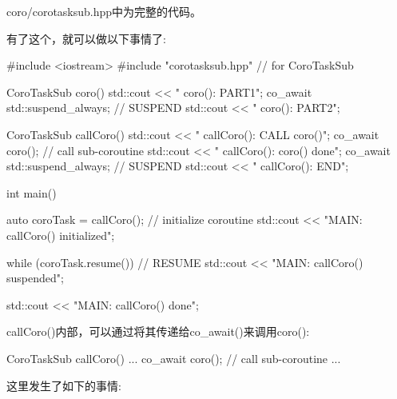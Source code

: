 coro/corotasksub.hpp中为完整的代码。

有了这个，就可以做以下事情了:


\begin{cpp}
#include <iostream>
#include "corotasksub.hpp" // for CoroTaskSub

CoroTaskSub coro()
{
	std::cout << " coro(): PART1\n";
	co_await std::suspend_always{}; // SUSPEND
	std::cout << " coro(): PART2\n";
}

CoroTaskSub callCoro()
{
	std::cout << " callCoro(): CALL coro()\n";
	co_await coro(); // call sub-coroutine
	std::cout << " callCoro(): coro() done\n";
	co_await std::suspend_always{}; // SUSPEND
	std::cout << " callCoro(): END\n";
}

int main()
{
	auto coroTask = callCoro(); // initialize coroutine
	std::cout << "MAIN: callCoro() initialized\n";

	while (coroTask.resume()) { // RESUME
		std::cout << "MAIN: callCoro() suspended\n";
	}

	std::cout << "MAIN: callCoro() done\n";
}
\end{cpp}

callCoro()内部，可以通过将其传递给co\_await()来调用coro():

\begin{cpp}
CoroTaskSub callCoro()
{
	...
	co_await coro(); // call sub-coroutine
	...
}
\end{cpp}

这里发生了如下的事情:


